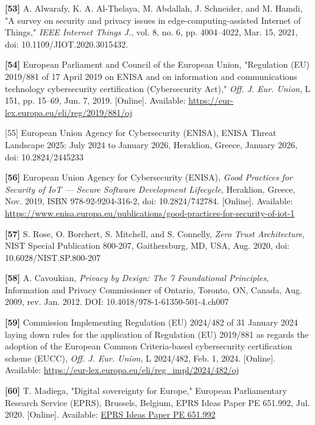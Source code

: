 \documentclass{ieeeaccess}
\begin{document}
\textbf{{[}53{]}} A. Alwarafy, K. A. Al-Thelaya, M. Abdallah, J.
Schneider, and M. Hamdi, "A survey on security and privacy issues in
edge-computing-assisted Internet of Things," \emph{IEEE Internet Things
J.}, vol. 8, no. 6, pp. 4004--4022, Mar. 15, 2021, doi:
10.1109/JIOT.2020.3015432.

\textbf{{[}54{]}} European Parliament and Council of the European Union,
"Regulation (EU) 2019/881 of 17 April 2019 on ENISA and on information
and communications technology cybersecurity certification (Cybersecurity
Act)," \emph{Off. J. Eur. Union}, L 151, pp. 15--69, Jun. 7, 2019.
{[}Online{]}. Available:
\href{https://eur-lex.europa.eu/eli/reg/2019/881/oj}{https://eur-lex.europa.eu/eli/reg/2019/881/oj}

{[}55{]} European Union Agency for Cybersecurity (ENISA), ENISA Threat
Landscape 2025: July 2024 to January 2026, Heraklion, Greece, January
2026, doi: 10.2824/2445233

\textbf{{[}56{]}} European Union Agency for Cybersecurity (ENISA),
\emph{Good Practices for Security of IoT --- Secure Software Development
Lifecycle}, Heraklion, Greece, Nov. 2019, ISBN 978-92-9204-316-2, doi:
10.2824/742784. {[}Online{]}. Available:
\href{https://www.enisa.europa.eu/publications/good-practices-for-security-of-iot-1}{https://www.enisa.europa.eu/publications/good-practices-for-security-of-iot-1}

\textbf{{[}57{]}} S. Rose, O. Borchert, S. Mitchell, and S. Connelly,
\emph{Zero Trust Architecture}, NIST Special Publication 800-207,
Gaithersburg, MD, USA, Aug. 2020, doi: 10.6028/NIST.SP.800-207

\textbf{{[}58{]}} A. Cavoukian, \emph{Privacy by Design: The 7
Foundational Principles}, Information and Privacy Commissioner of
Ontario, Toronto, ON, Canada, Aug. 2009, rev. Jan. 2012. DOI:
10.4018/978-1-61350-501-4.ch007

\textbf{{[}59{]}} Commission Implementing Regulation (EU) 2024/482 of 31
January 2024 laying down rules for the application of Regulation (EU)
2019/881 as regards the adoption of the European Common Criteria-based
cybersecurity certification scheme (EUCC), \emph{Off. J. Eur. Union}, L
2024/482, Feb. 1, 2024. {[}Online{]}. Available:
\href{https://eur-lex.europa.eu/eli/reg_impl/2024/482/oj}{https://eur-lex.europa.eu/eli/reg\_impl/2024/482/oj}

\textbf{{[}60{]}} T. Madiega, "Digital sovereignty for Europe," European
Parliamentary Research Service (EPRS), Brussels, Belgium, EPRS Ideas
Paper PE 651.992, Jul. 2020. {[}Online{]}. Available:
\href{https://www.europarl.europa.eu/thinktank/en/document/EPRS_BRI(2020)651992}{EPRS Ideas Paper PE 651.992}
\end{document}
